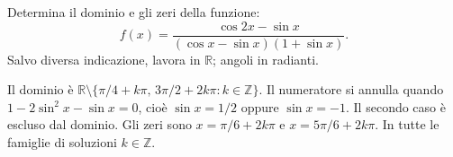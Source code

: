 
\begin{esercizio}
Determina il dominio e gli zeri della funzione: 
\[
f(x)=\dfrac{\cos 2x-\sin x}
{(\cos x-\sin x)(1+\sin x)}.
\]
Salvo diversa indicazione, lavora in $\mathbb R$; angoli in radianti.
\end{esercizio}

\begin{soluzione}
Il dominio è $\mathbb R\setminus\{\pi/4+k\pi,\,3\pi/2+2k\pi:k\in\mathbb Z\}$.
Il numeratore si annulla quando $1-2\sin^2x-\sin x=0$, cioè
$\sin x=1/2$ oppure $\sin x=-1$. Il secondo caso è escluso dal dominio.
Gli zeri sono $x=\pi/6+2k\pi$ e $x=5\pi/6+2k\pi$. In tutte le famiglie di soluzioni $k\in\mathbb{Z}$.
\end{soluzione}
